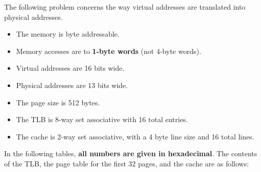 \begin{problem}{12}
The following problem concerns 
the way virtual addresses are translated into physical addresses.
\end{problem}

\begin{itemize}
\item The memory is byte addressable.
\item Memory accesses are to {\bf 1-byte words} (not 4-byte words).
\item Virtual addresses are 16 bits wide.
\item Physical addresses are 13 bits wide.
\item The page size is 512 bytes.
\item The TLB is 8-way set associative with 16 total entries.
\item The cache is 2-way set associative, with a 4 byte line size and 16 total lines.
\end{itemize}

In the following tables, {\bf all numbers are given in hexadecimal}.
The contents of the TLB, the page table for the first 32 pages, and
the cache are as follows:

